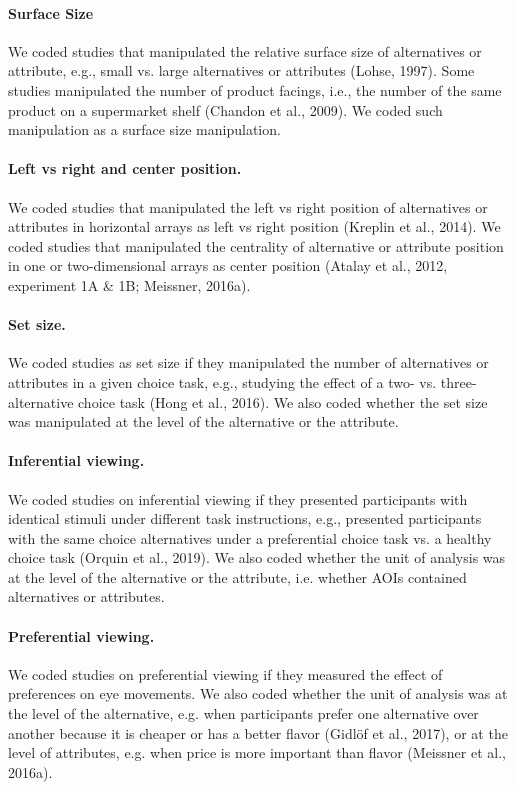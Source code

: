 \documentclass{article}
\begin{document}
\paragraph{Surface Size} We coded studies that manipulated the relative surface size of alternatives or attribute, e.g., small vs. large alternatives or attributes (Lohse, 1997). Some studies manipulated the number of product facings, i.e., the number of the same product on a supermarket shelf (Chandon et al., 2009). We coded such manipulation as a surface size manipulation. 

\paragraph{Left vs right and center position.} We coded studies that manipulated the left vs right position of alternatives or attributes in horizontal arrays as left vs right position (Kreplin et al., 2014). We coded studies that manipulated the centrality of alternative or attribute position in one or two-dimensional arrays as center position (Atalay et al., 2012, experiment 1A \& 1B; Meissner, 2016a).

\paragraph{Set size.} We coded studies as set size if they manipulated the number of alternatives or attributes in a given choice task, e.g., studying the effect of a two- vs. three-alternative choice task (Hong et al., 2016). We also coded whether the set size was manipulated at the level of the alternative or the attribute. 

\paragraph{Inferential viewing.} We coded studies on inferential viewing if they presented participants with identical stimuli under different task instructions, e.g., presented participants with the same choice alternatives under a preferential choice task vs. a healthy choice task (Orquin et al., 2019). We also coded whether the unit of analysis was at the level of the alternative or the attribute, i.e. whether AOIs contained alternatives or attributes. 

\paragraph{Preferential viewing.} We coded studies on preferential viewing if they measured the effect of preferences on eye movements. We also coded whether the unit of analysis was at the level of the alternative, e.g. when participants prefer one alternative over another because it is cheaper or has a better flavor (Gidlöf et al., 2017), or at the level of attributes, e.g. when price is more important than flavor (Meissner et al., 2016a). 
\end{document}
